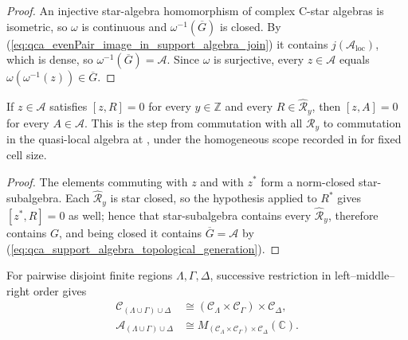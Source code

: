 \begin{proof}\leanok
    An injective star-algebra homomorphism of complex C-star algebras is
    isometric, so $\omega$ is continuous and
    $\omega^{-1}(\overline G)$ is closed.  By
    (\ref{eq:qca_evenPair_image_in_support_algebra_join}) it contains
    $j(\mathcal A_{\mathrm{loc}})$, which is dense, so
    $\omega^{-1}(\overline G)=\mathcal A$.  Since $\omega$ is surjective,
    every $z\in\mathcal A$ equals $\omega(\omega^{-1}(z))\in\overline G$.
\end{proof}

\begin{corollary}
    \label{cor:qca_support_algebra_commutant}
    \leanok
    If $z\in\mathcal A$ satisfies $[z,R]=0$ for every $y\in\mathbb Z$ and
    every $R\in\widehat{\mathcal R}_y$, then $[z,A]=0$ for every
    $A\in\mathcal A$.  This is the step from commutation with all
    $\mathcal R_y$ to commutation in the quasi-local algebra at \cite[lines~1279--1282]{Gross2012IndexTheory}, under the homogeneous scope recorded in \cite{gap:gnvw12_site_dependent_adjacent_generation_scope} for fixed
    cell
    size.
\end{corollary}

\begin{proof}\leanok
    The elements commuting with $z$ and with $z^*$ form a norm-closed
    star-subalgebra.  Each $\widehat{\mathcal R}_y$ is star closed, so the
    hypothesis applied to $R^*$ gives $[z^*,R]=0$ as well; hence that
    star-subalgebra contains every $\widehat{\mathcal R}_y$, therefore
    contains $G$, and being closed it contains
    $\overline G=\mathcal A$ by
    (\ref{eq:qca_support_algebra_topological_generation}).
\end{proof}

\begin{definition}
    \label{def:qca_tripartite_local_coordinates}
    \leanok
    For pairwise disjoint finite regions $\Lambda,\Gamma,\Delta$, successive
    restriction in left--middle--right order gives
    \begin{align}
        \mathcal C_{(\Lambda\cup\Gamma)\cup\Delta}
         & \cong(\mathcal C_\Lambda\times\mathcal C_\Gamma)
        \times\mathcal C_\Delta,                                \\
        \mathcal A_{(\Lambda\cup\Gamma)\cup\Delta}
         & \cong M_{(\mathcal C_\Lambda\times\mathcal C_\Gamma)
                \times\mathcal C_\Delta}(\mathbb C).
    \end{align}
\end{definition}

